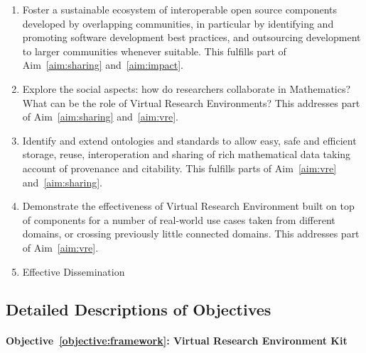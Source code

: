 \documentclass[noworkareas,deliverables,keys]{euproposal}                  %
\begin{document}
\begin{proposal}
\begin{enumerate}
\item \label{objective:sustainable} Foster a sustainable ecosystem of
  interoperable open source components developed by overlapping
  communities, in particular by identifying and promoting software
  development best practices, and outsourcing development to larger
  communities whenever suitable. This fulfills part of
  Aim~\ref{aim:sharing} and~\ref{aim:impact}.


\item \label{objective:social}Explore the social aspects: how do researchers collaborate in
  Mathematics? What can be the role of Virtual Research Environments?
  This addresses part of Aim~\ref{aim:sharing} and~\ref{aim:vre}.

\item \label{objective:data}Identify and extend ontologies and standards to
  allow easy, safe and efficient storage, reuse, interoperation and sharing of rich mathematical
  data taking account of provenance and citability. This fulfills
  parts of Aim~\ref{aim:vre} and~\ref{aim:sharing}.

\item \label{objective:demo}Demonstrate the effectiveness of Virtual Research Environment
  built on top of \TheProject components for a number of real-world
  use cases taken from different domains, or crossing previously
  little connected domains. This addresses part of Aim~\ref{aim:vre}.

\item \label{objective:disseminate}Effective Dissemination

\end{enumerate}

\subsection*{Detailed Descriptions of Objectives} %

\paragraph{Objective~\ref{objective:framework}: Virtual Research
  Environment Kit}\ 


\end{proposal}
\end{document}
